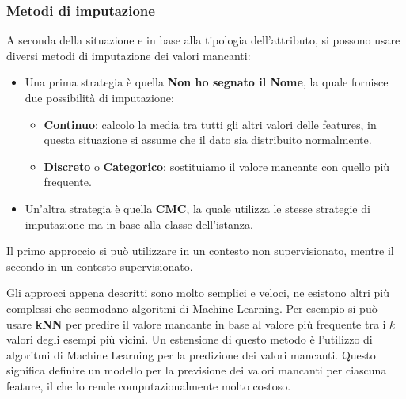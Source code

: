 \subsubsection{Metodi di imputazione}
A seconda della situazione e in base alla tipologia dell'attributo, si possono
usare diversi metodi di imputazione dei valori mancanti:
\begin{itemize}
    \item Una prima strategia è quella \textbf{Non ho segnato il Nome}, la quale
          fornisce due possibilità di imputazione:
          \begin{itemize}
              \item \textbf{Continuo}: calcolo la media tra tutti gli altri
                    valori delle features, in questa situazione si assume che il
                    dato sia distribuito normalmente.
              \item \textbf{Discreto} o \textbf{Categorico}: sostituiamo il valore
                    mancante con quello più frequente.
          \end{itemize}
    \item Un'altra strategia è quella \textbf{CMC}, la quale utilizza le stesse
          strategie di imputazione ma in base alla classe dell'istanza.
\end{itemize}
Il primo approccio si può utilizzare in un contesto non supervisionato, mentre il
secondo in un contesto supervisionato.

Gli approcci appena descritti sono molto semplici e veloci, ne esistono altri più
complessi che scomodano algoritmi di Machine Learning. Per esempio si può usare
\textbf{kNN} per predire il valore mancante in base al valore più frequente tra
i $k$ valori degli esempi più vicini. Un estensione di questo metodo è l'utilizzo
di algoritmi di Machine Learning per la predizione dei valori mancanti. Questo
significa definire un modello per la previsione dei valori mancanti per ciascuna
feature, il che lo rende computazionalmente molto costoso.
